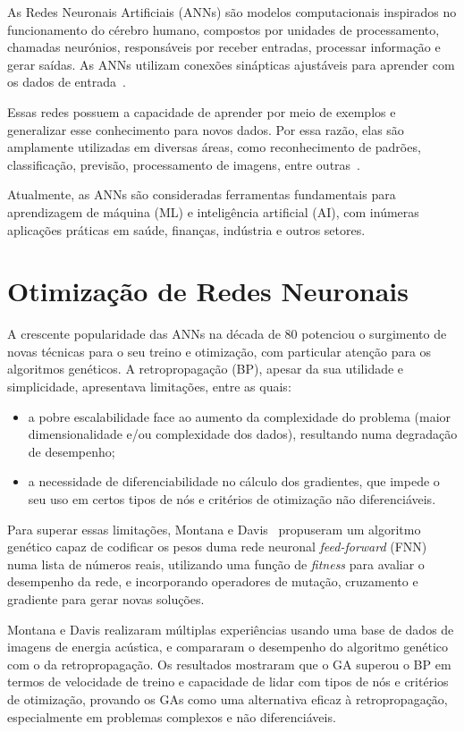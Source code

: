 As Redes Neuronais Artificiais (ANNs) são modelos computacionais inspirados no funcionamento do cérebro humano, compostos por unidades de processamento, chamadas neurónios, responsáveis por receber entradas, processar informação e gerar saídas.
As ANNs utilizam conexões sinápticas ajustáveis para aprender com os dados de entrada~\cite{Lippmann1988AnNets}.

Essas redes possuem a capacidade de aprender por meio de exemplos e generalizar esse conhecimento para novos dados.
Por essa razão, elas são amplamente utilizadas em diversas áreas, como reconhecimento de padrões, classificação, previsão, processamento de imagens, entre outras~\cite{Jain1996ArtificialTutorial}.

Atualmente, as ANNs são consideradas ferramentas fundamentais para aprendizagem de máquina (ML) e inteligência artificial (AI), com inúmeras aplicações práticas em saúde, finanças, indústria e outros setores.


\section{Otimização de Redes Neuronais}\label{sec:optim_nns}

A crescente popularidade das ANNs na década de 80 potenciou o surgimento de novas técnicas para o seu treino e otimização, com particular atenção para os algoritmos genéticos.
A retropropagação (BP), apesar da sua utilidade e simplicidade, apresentava limitações, entre as quais:
\begin{itemize}
    \item a pobre escalabilidade face ao aumento da complexidade do problema (maior dimensionalidade e/ou complexidade dos dados), resultando numa degradação de desempenho;
    \item a necessidade de diferenciabilidade no cálculo dos gradientes, que impede o seu uso em certos tipos de nós e critérios de otimização não diferenciáveis.
\end{itemize}

Para superar essas limitações, Montana e Davis~\cite{Montana1989} propuseram um algoritmo genético capaz de codificar os pesos duma rede neuronal \textit{feed-forward} (FNN) numa lista de números reais, utilizando uma função de \textit{fitness} para avaliar o desempenho da rede, e incorporando operadores de mutação, cruzamento e gradiente para gerar novas soluções.

Montana e Davis realizaram múltiplas experiências usando uma base de dados de imagens de energia acústica, e compararam o desempenho do algoritmo genético com o da retropropagação.
Os resultados mostraram que o GA superou o BP em termos de velocidade de treino e capacidade de lidar com tipos de nós e critérios de otimização, provando os GAs como uma alternativa eficaz à retropropagação, especialmente em problemas complexos e não diferenciáveis.